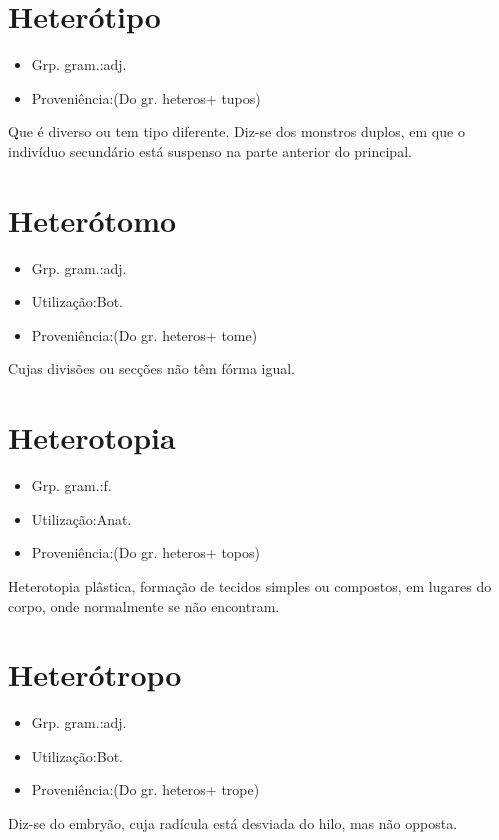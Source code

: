 \documentclass{article}
\begin{document}
\section{Heterótipo}
\begin{itemize}
\item {Grp. gram.:adj.}
\end{itemize}
\begin{itemize}
\item {Proveniência:(Do gr. \textunderscore heteros\textunderscore  + \textunderscore tupos\textunderscore )}
\end{itemize}
Que é diverso ou tem tipo diferente.
Diz-se dos monstros duplos, em que o indivíduo secundário está suspenso na parte anterior do principal.
\section{Heterótomo}
\begin{itemize}
\item {Grp. gram.:adj.}
\end{itemize}
\begin{itemize}
\item {Utilização:Bot.}
\end{itemize}
\begin{itemize}
\item {Proveniência:(Do gr. \textunderscore heteros\textunderscore  + \textunderscore tome\textunderscore )}
\end{itemize}
Cujas divisões ou secções não têm fórma igual.
\section{Heterotopia}
\begin{itemize}
\item {Grp. gram.:f.}
\end{itemize}
\begin{itemize}
\item {Utilização:Anat.}
\end{itemize}
\begin{itemize}
\item {Proveniência:(Do gr. \textunderscore heteros\textunderscore  + \textunderscore topos\textunderscore )}
\end{itemize}
\textunderscore Heterotopia plâstica\textunderscore , formação de tecidos simples ou compostos, em lugares do corpo, onde normalmente se não encontram.
\section{Heterótropo}
\begin{itemize}
\item {Grp. gram.:adj.}
\end{itemize}
\begin{itemize}
\item {Utilização:Bot.}
\end{itemize}
\begin{itemize}
\item {Proveniência:(Do gr. \textunderscore heteros\textunderscore  + \textunderscore trope\textunderscore )}
\end{itemize}
Diz-se do embryão, cuja radícula está desviada do hilo, mas não opposta.
\end{document}
